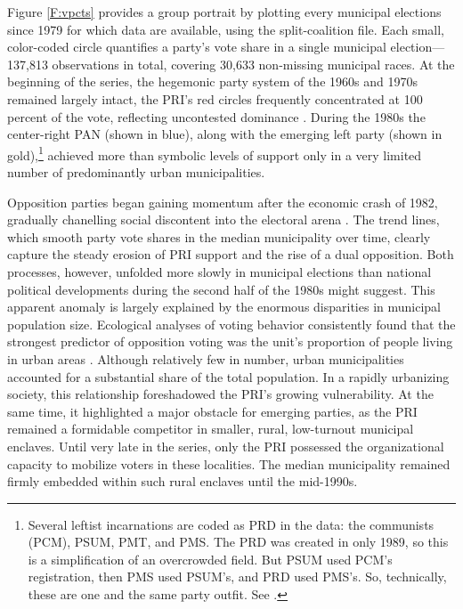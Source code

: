 \documentclass[letter,12pt]{article}
\begin{document}
Figure \ref{F:vpcts} provides a group portrait by plotting every municipal elections since 1979 for which data are available, using the split-coalition file. Each small, color-coded circle quantifies a party's vote share in a single municipal election---137,813 observations in total, covering 30,633 non-missing municipal races. At the beginning of the series, the hegemonic party system of the 1960s and 1970s remained largely intact, the PRI's red circles frequently concentrated at 100 percent of the vote, reflecting uncontested dominance \citep{segovia.els1979}. During the 1980s the center-right PAN (shown in blue), along with the emerging left party (shown in gold),\footnote{Several leftist incarnations are coded as PRD in the data: the communists (PCM), PSUM, PMT, and PMS. The PRD was created in only 1989, so this is a simplification of an overcrowded field. But PSUM used PCM's registration, then PMS used PSUM's, and PRD used PMS's. So, technically, these are one and the same party outfit. See \citet{molinar.1991a}.} achieved more than symbolic levels of support only in a very limited number of predominantly urban municipalities.

Opposition parties began gaining momentum after the economic crash of 1982, gradually chanelling social discontent into the electoral arena \citep{molinar.1991a, klesner.Alignment.1993, hiskey.canache.2005, gomezTagle.Estadisticas1990, segovia.dientes-sierra1983}. The trend lines, which smooth party vote shares in the median municipality over time, clearly capture the steady erosion of PRI support and the rise of a dual opposition. Both processes, however, unfolded more slowly in municipal elections than national political developments during the second half of the 1980s might suggest. This apparent anomaly is largely explained by the enormous disparities in municipal population size. Ecological analyses of voting behavior consistently found that the strongest predictor of opposition voting was the unit's proportion of people living in urban areas \citep{ames.1970, lehr.1985, magar.1994, walton.sween-1973, pacheco.VotoUrb.1997}. Although relatively few in number, urban municipalities accounted for a substantial share of the total population. In a rapidly urbanizing society, this relationship foreshadowed the PRI's growing vulnerability. At the same time, it highlighted a major obstacle for emerging parties, as the PRI remained a formidable competitor in smaller, rural, low-turnout municipal enclaves. Until very late in the series, only the PRI possessed the organizational capacity to mobilize voters in these localities. The median municipality remained firmly embedded within such rural enclaves until the mid-1990s.
\end{document}
